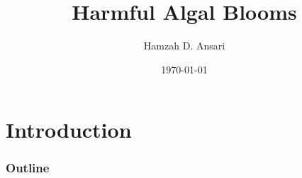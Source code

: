\documentclass{beamer}
\title{Harmful Algal Blooms}
\author{Hamzah D. Ansari}
\institute{Oakland University}
\date{\today}
\begin{document}
\section{Introduction}
\begin{frame} 
\titlepage
\end{frame}

\begin{frame}
	\frametitle{Outline}

	\tableofcontents

\end{frame}
\end{document}
